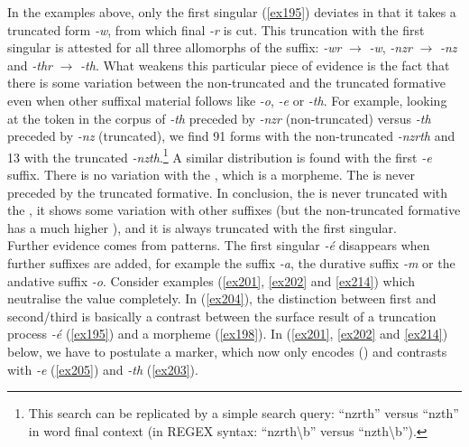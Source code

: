 In the examples above, only the first singular (\ref{ex195}) deviates in that it takes a truncated form \emph{-w}, from which final \emph{-r} is cut. This truncation with the first singular is attested for all three allomorphs of the  suffix: \emph{-wr} $\rightarrow$ \emph{-w}, \emph{-nzr} $\rightarrow$ \emph{-nz} and \emph{-thr} $\rightarrow$ \emph{-th}. What weakens this particular piece of evidence is the fact that there is some variation between the non-truncated and the truncated formative even when other suffixal material follows like \Andat{} \emph{-o}, \Fnsg{} \emph{-e} or \Stnsg{} \emph{-th}. For example, looking at the token  in the corpus of \Stnsg{} \emph{-th} preceded by \emph{-nzr} (non-truncated) versus \emph{-th} preceded by \emph{-nz} (truncated), we find 91  forms with the non-truncated  \emph{-nzrth} and 13 with the truncated  \emph{-nzth}.\footnote{This search can be replicated by a simple search query: ``nzrth'' versus ``nzth'' in word final context (in \textsc{REGEX} syntax: ``nzrth\textbackslash b'' versus ``nzth\textbackslash b'').} A similar distribution is found with the first  \emph{-e} suffix. There is no variation with the \Stsg{}, which is a  morpheme. The \Stsg{} is never preceded by the truncated formative. In conclusion, the  is never truncated with the \Stsg{} , it shows some variation with other suffixes (but the non-truncated formative has a much higher ), and it is always truncated with the first singular.\\

Further evidence comes from   patterns. The first singular \emph{-é} disappears when further suffixes are added, for example the  suffix \emph{-a}, the durative suffix \emph{-m} or the andative suffix \emph{-o}. Consider examples (\ref{ex201}, \ref{ex202} and \ref{ex214}) which neutralise the  value completely. In (\ref{ex204}), the distinction between first and second/third  is basically a contrast between the surface result of a truncation process \emph{-é} (\ref{ex195}) and a  morpheme (\ref{ex198}). In (\ref{ex201}, \ref{ex202} and \ref{ex214}) below, we have to postulate a  marker, which now only encodes  (\Sg) and contrasts with \Fnsg{} \emph{-e} (\ref{ex205}) and \Stnsg{} \emph{-th} (\ref{ex203}).


